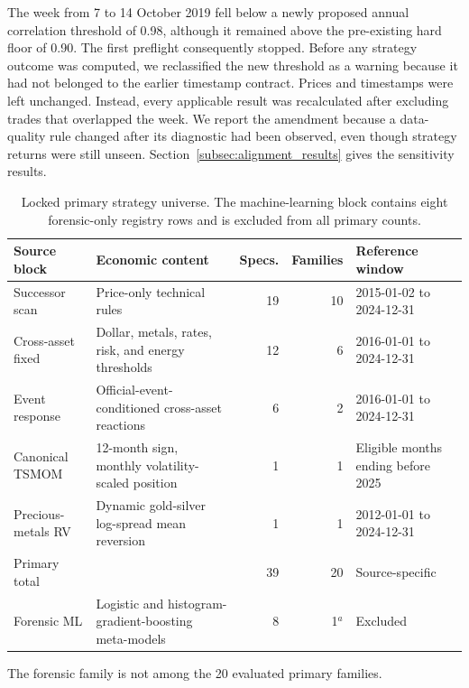 The week from 7 to 14 October 2019 fell below a newly proposed annual correlation threshold of 0.98, although it remained above the pre-existing hard floor of 0.90. The first preflight consequently stopped. Before any strategy outcome was computed, we reclassified the new threshold as a warning because it had not belonged to the earlier timestamp contract. Prices and timestamps were left unchanged. Instead, every applicable result was recalculated after excluding trades that overlapped the week. We report the amendment because a data-quality rule changed after its diagnostic had been observed, even though strategy returns were still unseen. Section~\ref{subsec:alignment_results} gives the sensitivity results.

\begin{table}[t]
\centering
\caption{Locked primary strategy universe. The machine-learning block contains eight forensic-only registry rows and is excluded from all primary counts.}\label{tab:universe}
\begin{threeparttable}
\small
\begin{tabular}{p{2.65cm}p{3.15cm}rrp{3.1cm}}
\toprule
Source block & Economic content & Specs. & Families & Reference window \\
\midrule
Successor scan & Price-only technical rules & 19 & 10 & 2015-01-02 to 2024-12-31 \\
Cross-asset fixed & Dollar, metals, rates, risk, and energy thresholds & 12 & 6 & 2016-01-01 to 2024-12-31 \\
Event response & Official-event-conditioned cross-asset reactions & 6 & 2 & 2016-01-01 to 2024-12-31 \\
Canonical TSMOM & 12-month sign, monthly volatility-scaled position & 1 & 1 & Eligible months ending before 2025 \\
Precious-metals RV & Dynamic gold-silver log-spread mean reversion & 1 & 1 & 2012-01-01 to 2024-12-31 \\
\midrule
Primary total & & 39 & 20 & Source-specific \\
Forensic ML & Logistic and histogram-gradient-boosting meta-models & 8 & 1$^{a}$ & Excluded \\
\bottomrule
\end{tabular}
\begin{tablenotes}[flushleft]\footnotesize
\item[$^{a}$] The forensic family is not among the 20 evaluated primary families.
\end{tablenotes}
\end{threeparttable}
\end{table}

